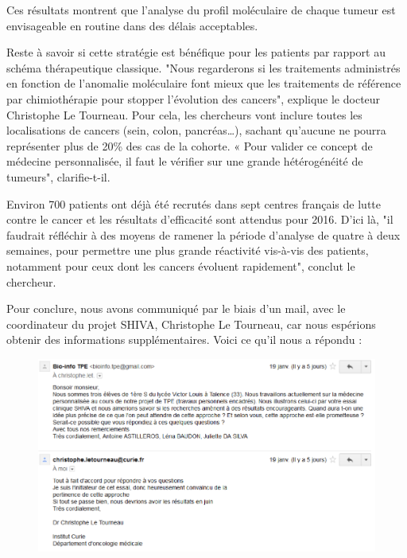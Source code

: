 \documentclass[12pt, openany]{report}
\begin{document}
Ces résultats montrent que l’analyse du profil moléculaire de chaque tumeur est envisageable en routine dans des délais acceptables. 

Reste à savoir si cette stratégie est bénéfique pour les patients par rapport au schéma thérapeutique classique. "Nous regarderons si les traitements administrés en fonction de l’anomalie moléculaire font mieux que les traitements de référence par chimiothérapie pour stopper l’évolution des cancers", explique le docteur Christophe Le Tourneau. Pour cela, les chercheurs vont inclure toutes les localisations de cancers (sein, colon, pancréas…), sachant qu’aucune ne pourra représenter plus de 20\% des cas de la cohorte. « Pour valider ce concept de médecine personnalisée, il faut le vérifier sur une grande hétérogénéité de tumeurs", clarifie-t-il.

Environ 700 patients ont déjà été recrutés dans sept centres français de lutte contre le cancer  et les résultats d’efficacité sont attendus pour 2016. D’ici là, "il faudrait réfléchir à des moyens de ramener la période d’analyse de quatre à deux semaines, pour permettre une plus grande réactivité vis-à-vis des patients, notamment pour ceux dont les cancers évoluent rapidement", conclut le chercheur.

	Pour conclure, nous avons communiqué par le biais d’un mail, avec le coordinateur du projet SHIVA, Christophe Le Tourneau, car nous espérions obtenir des informations supplémentaires. Voici ce qu’il nous a répondu :

 \begin{figure}[H]
\begin{center}
    \includegraphics[scale=0.9]{Images/im22.png}
\end{center}
\end{figure}
\end{document}
